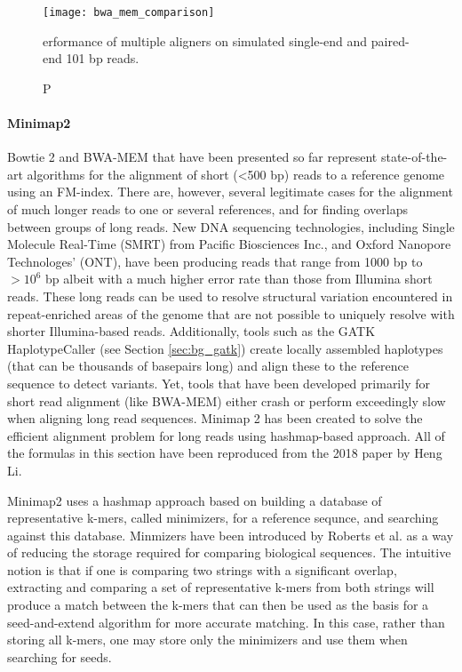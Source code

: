 \begin{figure}[H]
    \texttt{[image: bwa\_mem\_comparison]}
    \centering
    \caption Performance of multiple aligners on simulated single-end and paired-end 101 bp reads.\autocite{li2013aligning}
    \label{fig:bwa_mem_comparison}
\end{figure}

\paragraph{Minimap2}

Bowtie 2 and BWA-MEM that have been presented so far represent state-of-the-art algorithms for the alignment of short (<500 bp) reads to a reference genome using an FM-index. There are, however, several legitimate cases for the alignment of much longer reads to one or several references, and for finding overlaps between groups of long reads. New DNA sequencing technologies, including Single Molecule Real-Time (SMRT)\autocite{rhoads2015pacbio} from Pacific Biosciences Inc., and Oxford Nanopore Technologes' (ONT)\autocite{lu2016oxford}, have been producing reads that range from 1000 bp to $>10^6$ bp albeit with a much higher error rate than those from Illumina short reads. These long reads can be used to resolve structural variation encountered in repeat-enriched areas of the genome that are not possible to uniquely resolve with shorter Illumina-based reads\autocite{roberts2013advantages}. Additionally, tools such as the GATK HaplotypeCaller (see Section \ref{sec:bg_gatk}) create locally assembled haplotypes (that can be thousands of basepairs long) and align these to the reference sequence to detect variants. Yet, tools that have been developed primarily for short read alignment (like BWA-MEM) either crash or perform exceedingly slow when aligning long read sequences. Minimap 2\autocite{li2018minimap2} has been created to solve the efficient alignment problem for long reads using hashmap-based approach. All of the formulas in this section have been reproduced from the 2018 paper by Heng Li\autocite{li2018minimap2}.

Minimap2 uses a hashmap approach based on building a database of representative k-mers, called minimizers, for a reference sequnce, and searching against this database. Minmizers have been introduced by Roberts et al.\autocite{roberts2004reducing} as a way of reducing the storage required for comparing biological sequences. The intuitive notion is that if one is comparing two strings with a significant overlap, extracting and comparing a set of representative k-mers from both strings will produce a match between the k-mers that can then be used as the basis for a seed-and-extend algorithm for more accurate matching. In this case, rather than storing all k-mers, one may store only the minimizers and use them when searching for seeds.

